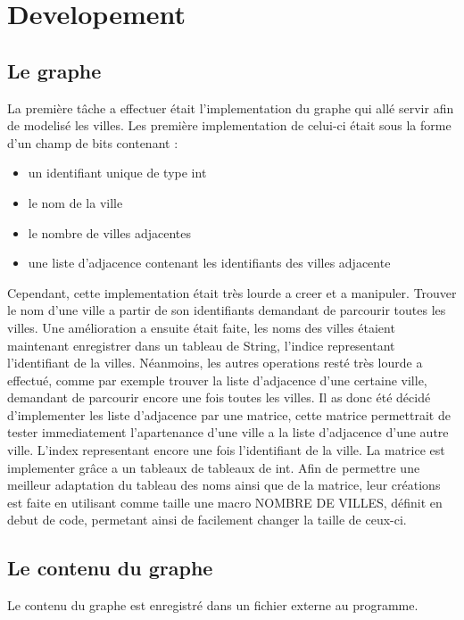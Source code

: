 \documentclass[a4paper, 12pt]{article}
\begin{document}
 \newpage
 
\section{Developement}
    \subsection{Le graphe}
        La première tâche a effectuer était l'implementation du graphe qui allé servir afin de modelisé les villes.
        Les première implementation de celui-ci était sous la forme d'un champ de bits contenant :
        

        \begin{itemize}
            \item un identifiant unique de type int
            \item le nom de la ville
            \item le nombre de villes adjacentes
            \item une liste d'adjacence contenant les identifiants des villes adjacente
        \end{itemize}
        Cependant, cette implementation était très lourde a creer et a manipuler.
        Trouver le nom d'une ville a partir de son identifiants demandant de parcourir toutes les villes.
        Une amélioration a ensuite était faite, les noms des villes étaient maintenant enregistrer dans un tableau de String, l'indice representant l'identifiant de la villes.
        Néanmoins, les autres operations resté très lourde a effectué, comme par exemple trouver la liste d'adjacence d'une certaine ville, demandant de parcourir encore une fois toutes les villes.
        Il as donc été décidé d'implementer les liste d'adjacence par une matrice, cette matrice permettrait de tester immediatement l'apartenance d'une ville a la liste d'adjacence d'une autre ville.
        L'index representant encore une fois l'identifiant de la ville.
        La matrice est implementer grâce a un tableaux de tableaux de int.
        Afin de permettre une meilleur adaptation du tableau des noms ainsi que de la matrice, leur créations est faite en utilisant comme taille une macro NOMBRE DE VILLES, définit en debut de code, permetant ainsi de facilement changer la taille de ceux-ci.
    \subsection{Le contenu du graphe}
        Le contenu du graphe est enregistré dans un fichier externe au programme.
        
\end{document}

